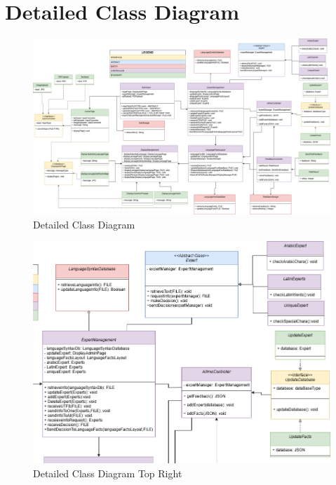 \section{Detailed Class Diagram}
\label{sec:detailed_class_diagram}

\begin{figure}[H]
	\centering
	\includegraphics[width=\textwidth, height=\textheight, keepaspectratio]{Section4/images/LangufiyClassDiagramV8.png}
	\caption{Detailed Class Diagram}
	\label{DetailedClassDiagram}
\end{figure}

\begin{figure}[H]
	\centering
	\includegraphics[width=\textwidth, height=\textheight, keepaspectratio]{Section4/images/LangufiyClassDiagramV6TR.png}
	\caption{Detailed Class Diagram Top Right}
	\label{DetailedClassDiagramQ1}
\end{figure}

